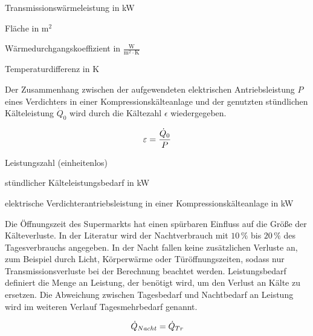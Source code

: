 \begin{description}[\dth]

	\item[$\ptrans$] Transmissionswärmeleistung in kW
	\item[$A$] Fläche in $\mathrm{m^2}$
	\item[$k$] Wärmedurchgangskoeffizient in $\mathrm{\frac{W}{m^2 \cdot
	K}}$
	\item[$\Delta\: t$] Temperaturdifferenz in K

\end{description}
\vspace{0.5cm}

Der Zusammenhang zwischen der aufgewendeten elektrischen Antriebsleistung $P$
eines Verdichters in einer Kompressionskälteanlage und der genutzten
st\"undlichen Kälteleistung ${\dot{Q}}_0$ wird durch die Kältezahl $\epsilon$
wiedergegeben.

\begin{equation}
	\epsilon = \frac{\pkalt}{P}
\label{epsilon}
\end{equation}

\begin{description}[\dth]

	\item[$\epsilon$] Leistungszahl (einheitenlos)
	\item[$\pkalt$] st\"undlicher Kälteleistungsbedarf in kW
	\item[$P$] elektrische Verdichterantriebsleistung in einer
		Kompressionskälteanlage in kW

\end{description}
\vspace{0.5cm}

Die Öffnungszeit des Supermarkts hat einen spürbaren Einfluss auf die Größe der
K\"alteverluste. In der Literatur wird der Nachtverbrauch mit $10\,\%$ bis $20\,\%$
des Tagesverbrauchs angegeben\cite{kauffeld}.  In der Nacht fallen keine
zusätzlichen Verluste an, zum Beispiel durch Licht, Körperwärme oder
Türöffnungszeiten, sodass nur Transmissionsverluste bei der Berechnung beachtet
werden. Leistungsbedarf definiert die Menge an Leistung, der ben\"otigt wird, um
den Verlust an K\"alte zu ersetzen. Die Abweichung zwischen Tagesbedarf und
Nachtbedarf an Leistung wird im weiteren Verlauf Tagesmehrbedarf genannt.

\begin{equation}
	\dot{Q}_{Nacht}=\ptrans
\label{pnacht}
\end{equation}

